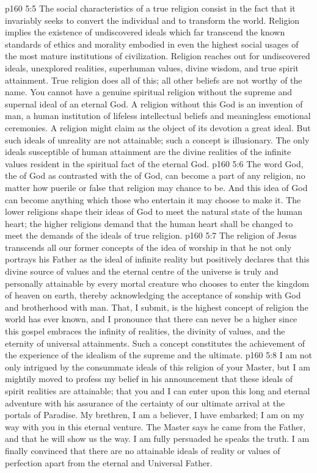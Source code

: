 \vs p160 5:5 The social characteristics of a true religion consist in the fact that it invariably seeks to convert the individual and to transform the world. Religion implies the existence of undiscovered ideals which far transcend the known standards of ethics and morality embodied in even the highest social usages of the most mature institutions of civilization. Religion reaches out for undiscovered ideals, unexplored realities, superhuman values, divine wisdom, and true spirit attainment. True religion does all of this; all other beliefs are not worthy of the name. You cannot have a genuine spiritual religion without the supreme and supernal ideal of an eternal God. A religion without this God is an invention of man, a human institution of lifeless intellectual beliefs and meaningless emotional ceremonies. A religion might claim as the object of its devotion a great ideal. But such ideals of unreality are not attainable; such a concept is illusionary. The only ideals susceptible of human attainment are the divine realities of the infinite values resident in the spiritual fact of the eternal God.
\vs p160 5:6 The word God, the  of God as contrasted with the  of God, can become a part of any religion, no matter how puerile or false that religion may chance to be. And this idea of God can become anything which those who entertain it may choose to make it. The lower religions shape their ideas of God to meet the natural state of the human heart; the higher religions demand that the human heart shall be changed to meet the demands of the ideals of true religion.
\vs p160 5:7 \pc The religion of Jesus transcends all our former concepts of the idea of worship in that he not only portrays his Father as the ideal of infinite reality but positively declares that this divine source of values and the eternal centre of the universe is truly and personally attainable by every mortal creature who chooses to enter the kingdom of heaven on earth, thereby acknowledging the acceptance of sonship with God and brotherhood with man. That, I submit, is the highest concept of religion the world has ever known, and I pronounce that there can never be a higher since this gospel embraces the infinity of realities, the divinity of values, and the eternity of universal attainments. Such a concept constitutes the achievement of the experience of the idealism of the supreme and the ultimate.
\vs p160 5:8 I am not only intrigued by the consummate ideals of this religion of your Master, but I am mightily moved to profess my belief in his announcement that these ideals of spirit realities are attainable; that you and I can enter upon this long and eternal adventure with his assurance of the certainty of our ultimate arrival at the portals of Paradise. My brethren, I am a believer, I have embarked; I am on my way with you in this eternal venture. The Master says he came from the Father, and that he will show us the way. I am fully persuaded he speaks the truth. I am finally convinced that there are no attainable ideals of reality or values of perfection apart from the eternal and Universal Father.
